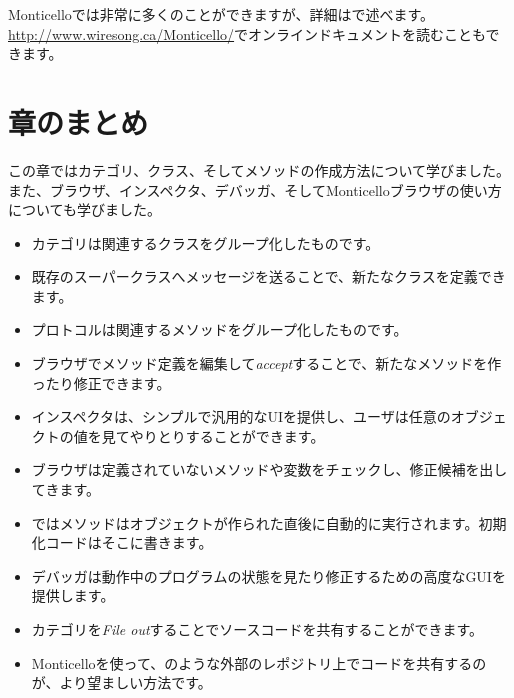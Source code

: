 \documentclass[a4paper,10pt,twoside]{book}
\begin{document}
Monticelloでは非常に多くのことができますが、詳細はで述べます。
\url{http://www.wiresong.ca/Monticello/}でオンラインドキュメントを読むこともできます。

\section{章のまとめ}
この章ではカテゴリ、クラス、そしてメソッドの作成方法について学びました。
また、ブラウザ、インスペクタ、デバッガ、そしてMonticelloブラウザの使い方についても学びました。

\begin{itemize}
  \item カテゴリは関連するクラスをグループ化したものです。
  \item 既存のスーパークラスへメッセージを送ることで、新たなクラスを定義できます。
  \item プロトコルは関連するメソッドをグループ化したものです。
  \item ブラウザでメソッド定義を編集して\emph{accept}することで、新たなメソッドを作ったり修正できます。
  \item インスペクタは、シンプルで汎用的なUIを提供し、ユーザは任意のオブジェクトの値を見てやりとりすることができます。
  \item ブラウザは定義されていないメソッドや変数をチェックし、修正候補を出してきます。
  \item \pharo ではメソッドはオブジェクトが作られた直後に自動的に実行されます。初期化コードはそこに書きます。
  \item デバッガは動作中のプログラムの状態を見たり修正するための高度なGUIを提供します。
  \item カテゴリを\emph{File out}することでソースコードを共有することができます。
  \item Monticelloを使って、\sqsrc のような外部のレポジトリ上でコードを共有するのが、より望ましい方法です。
\end{itemize}

\ifx\wholebook\relax\else
\end{document}
